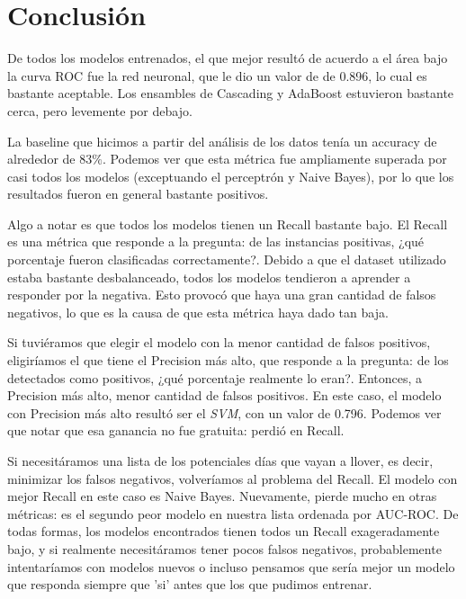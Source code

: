 \documentclass[12pt]{article}
\numberwithin{equation}{section}
\numberwithin{figure}{section}
\numberwithin{table}{section}
\begin{document}
	
	\endgroup
	
	
	\restoregeometry
	
	\pagebreak

	\section{Conclusión}
	De todos los modelos entrenados, el que mejor resultó de acuerdo a
	el área bajo la curva ROC fue la red neuronal, que le dio un valor de
	de 0.896, lo cual es bastante aceptable. Los ensambles de Cascading
	y AdaBoost estuvieron bastante cerca, pero levemente por debajo.

	La baseline que hicimos a partir del análisis de los datos tenía un
	accuracy de alrededor de $83\%$. Podemos ver que esta métrica fue
	ampliamente superada por casi todos los modelos (exceptuando el
	perceptrón y Naive Bayes), por lo que los resultados fueron en general
	bastante positivos.

	Algo a notar es que todos los modelos tienen un Recall bastante bajo.
	El Recall es una métrica que responde a la pregunta: de las instancias
	positivas, ¿qué porcentaje fueron clasificadas correctamente?. Debido
	a que el dataset utilizado estaba bastante desbalanceado, todos los modelos
	tendieron a aprender a responder por la negativa. Esto provocó que haya
	una gran cantidad de falsos negativos, lo que es la causa de que esta métrica
	haya dado tan baja.

	Si tuviéramos que elegir el modelo con la menor cantidad de falsos positivos,
	eligiríamos el que tiene el Precision más alto, que responde a la pregunta:
	de los detectados como positivos, ¿qué porcentaje realmente lo eran?. Entonces,
	a Precision más alto, menor cantidad de falsos positivos. En este caso, el
	modelo con Precision más alto resultó ser el \textit{SVM}, con un valor de 
	0.796. Podemos ver que notar que esa ganancia no fue gratuita: perdió en Recall.

	Si necesitáramos una lista de los potenciales días que vayan a llover, es decir,
	minimizar los falsos negativos, volveríamos al problema del Recall. El modelo
	con mejor Recall en este caso es Naive Bayes. Nuevamente, pierde mucho en otras
	métricas: es el segundo peor modelo en nuestra lista ordenada por AUC-ROC. De
	todas formas, los modelos encontrados tienen todos un Recall exageradamente bajo, y
	si realmente necesitáramos tener pocos falsos negativos, probablemente intentaríamos
	con modelos nuevos o incluso pensamos que sería mejor un modelo que responda siempre
	que 'si' antes que los que pudimos entrenar.
\end{document}
